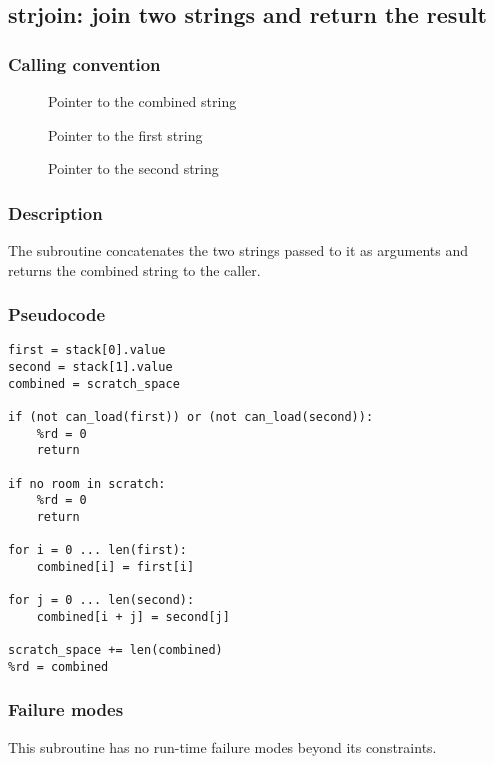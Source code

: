 \clearpage
{}
{}
\label{subr:strjoin}
\subsection*{strjoin: join two strings and return the result}

\subsubsection*{Calling convention}

\begin{description}
\item[] Pointer to the combined string
\item[] Pointer to the first string
\item[] Pointer to the second string
\end{description}

\subsubsection*{Description}

The  subroutine concatenates the two strings
passed to it as arguments and returns the combined string to the
caller.

\subsubsection*{Pseudocode}

\begin{verbatim}
first = stack[0].value
second = stack[1].value
combined = scratch_space

if (not can_load(first)) or (not can_load(second)):
    %rd = 0
    return

if no room in scratch:
    %rd = 0
    return

for i = 0 ... len(first):
    combined[i] = first[i]

for j = 0 ... len(second):
    combined[i + j] = second[j]

scratch_space += len(combined)
%rd = combined
\end{verbatim}

\subsubsection*{Failure modes}

This subroutine has no run-time failure modes beyond its constraints.
